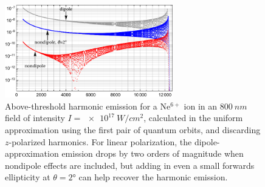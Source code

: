 \begin{figure}[p]
  \centering
  \includegraphics[width=0.65\textwidth]{9-Nondipole-HHG/Figures/figure9F.pdf} 
  \caption[
  Harmonic emission from a Ne$^{6+}$ ion in an $\SI{800}{nm}$ field of intensity $I=\SI{e17}{W/cm^2}$, showing the damping from nondipole effects and the recovery when the beams are non-collinear
  ]{
  Above-threshold harmonic emission for a Ne$^{6+}$ ion in an $\SI{800}{nm}$ field of intensity $I=\SI{e17}{W/cm^2}$, calculated in the uniform approximation using the first pair of quantum orbits, and discarding $z$-polarized harmonics. For linear polarization, the dipole-approximation emission drops by two orders of magnitude when nondipole effects are included, but adding in even a small forwards ellipticity at $\theta=2\si{\degree}$ can help recover the harmonic emission. 
  }
\label{f8-harmonic-recovery-spectra}
\end{figure}


